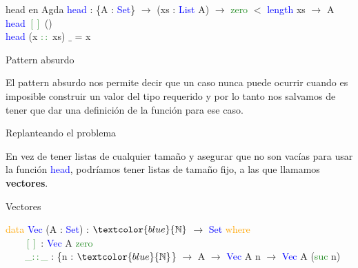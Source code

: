 \documentclass[xcolor=dvipsnames]{beamer} %
\newcommand{\cf}[1]{\textcolor{blue}{#1}}
\newcommand{\ct}[1]{\textcolor{blue}{#1}}
\newcommand{\cc}[1]{\textcolor{ForestGreen}{#1}}
\newcommand{\ck}[1]{\textcolor{orange}{#1}}
\newcommand{\N}{\ct{\mathbb{N}}}
\newcommand{\ra}{\rightarrow}
\newcommand{\T}{ \ \ \ \ }
\begin{document}
\begin{frame}

  \begin{block}{head en Agda}
    \cf{head} : \{A : \ct{Set}\}  $\ra$ (xs : \ct{List} A) $\ra$ 
    \cc{zero} $<$ \ct{length} xs $\rightarrow$ A \\
    \cf{head} \cc{$[]$} ()\\
    \cf{head} (x \cc{$::$} xs) $\_$ = x
  \end{block}
  
\begin{block}{Pattern absurdo}

El pattern absurdo nos permite decir que un caso nunca puede
ocurrir cuando es imposible construir un valor del tipo requerido y por
lo tanto nos salvamos de tener que dar una definición de la función
para ese caso.

\end{block}

\end{frame}

\begin{frame}

\begin{block}{Replanteando el problema}

En vez de tener listas de cualquier tamaño y asegurar
que no son vacías para usar la función \cf{head}, podríamos
tener listas de tamaño fijo, a las que llamamos \textbf{vectores}.
\end{block}

\pause

\begin{block}{Vectores}

\ck{data} \ct{Vec} (A : \ct{Set}) : $\N$ $\ra$ \ct{Set} \ck{where}\\
\pause
\T \cc{$[]$}     : \ct{Vec} A \cc{zero}\\
\pause
\T \cc{\_$::$\_} : \{n : $\N$\} $\ra$ A $\ra$ \ct{Vec} A n $\ra$ \ct{Vec} A (\cc{suc} n)

\end{block}

\end{frame}
\end{document}
